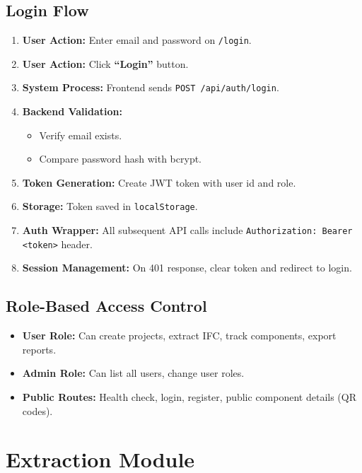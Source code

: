 \documentclass[11pt,a4paper]{article}
\begin{document}
\subsection{Login Flow}

\begin{enumerate}[leftmargin=*]
    \item \textbf{User Action:} Enter email and password on \texttt{/login}.
    \item \textbf{User Action:} Click \textbf{``Login''} button.
    \item \textbf{System Process:} Frontend sends \texttt{POST /api/auth/login}.
    \item \textbf{Backend Validation:}
        \begin{itemize}
            \item Verify email exists.
            \item Compare password hash with bcrypt.
        \end{itemize}
    \item \textbf{Token Generation:} Create JWT token with user id and role.
    \item \textbf{Storage:} Token saved in \texttt{localStorage}.
    \item \textbf{Auth Wrapper:} All subsequent API calls include \texttt{Authorization: Bearer <token>} header.
    \item \textbf{Session Management:} On 401 response, clear token and redirect to login.
\end{enumerate}

\subsection{Role-Based Access Control}

\begin{itemize}
    \item \textbf{User Role:} Can create projects, extract IFC, track components, export reports.
    \item \textbf{Admin Role:} Can list all users, change user roles.
    \item \textbf{Public Routes:} Health check, login, register, public component details (QR codes).
\end{itemize}

\section{Extraction Module}
\end{document}
